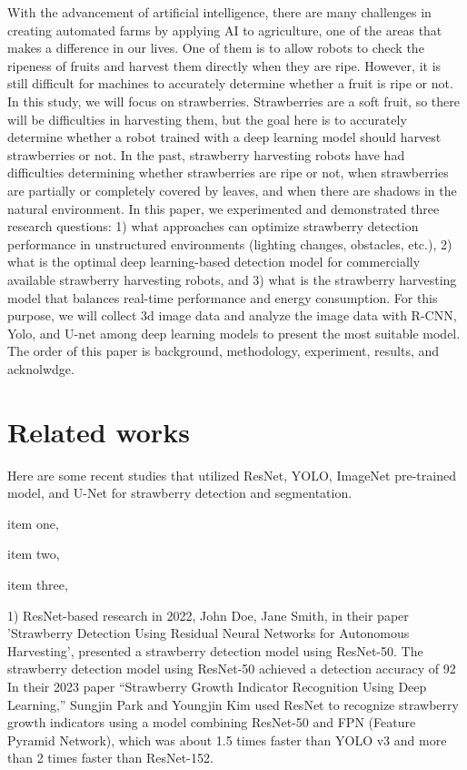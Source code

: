 \documentclass{ws-ijprai}
\begin{document}
With the advancement of artificial intelligence, there are many challenges in creating automated farms by applying AI to agriculture, one of the areas that makes a difference in our lives. One of them is to allow robots to check the ripeness of fruits and harvest them directly when they are ripe. However, it is still difficult for machines to accurately determine whether a fruit is ripe or not. In this study, we will focus on strawberries. Strawberries are a soft fruit, so there will be difficulties in harvesting them, but the goal here is to accurately determine whether a robot trained with a deep learning model should harvest strawberries or not. In the past, strawberry harvesting robots have had difficulties determining whether strawberries are ripe or not, when strawberries are partially or completely covered by leaves, and when there are shadows in the natural environment. In this paper, we experimented and demonstrated three research questions: 1) what approaches can optimize strawberry detection performance in unstructured environments (lighting changes, obstacles, etc.), 2) what is the optimal deep learning-based detection model for commercially available strawberry harvesting robots, and 3) what is the strawberry harvesting model that balances real-time performance and energy consumption. For this purpose, we will collect 3d image data and analyze the image data with R-CNN, Yolo, and U-net among deep learning models to present the most suitable model. The order of this paper is background, methodology, experiment, results, and acknolwdge.  

\section{Related works}

Here are some recent studies that utilized ResNet, YOLO, ImageNet pre-trained model, and U-Net for strawberry detection and segmentation. 

\begin{arabiclist}
 \item item one,
 \item item two,
 \item item three,
\end{arabiclist}

1) ResNet-based research
in 2022, John Doe, Jane Smith, in their paper 'Strawberry Detection Using Residual Neural Networks for Autonomous Harvesting', presented a strawberry detection model using ResNet-50. 
The strawberry detection model using ResNet-50 achieved a detection accuracy of 92%
In their 2023 paper “Strawberry Growth Indicator Recognition Using Deep Learning,” Sungjin Park and Youngjin Kim used ResNet to recognize strawberry growth indicators using a model combining ResNet-50 and FPN (Feature Pyramid Network), which was about 1.5 times faster than YOLO v3 and more than 2 times faster than ResNet-152. 
\end{document}
